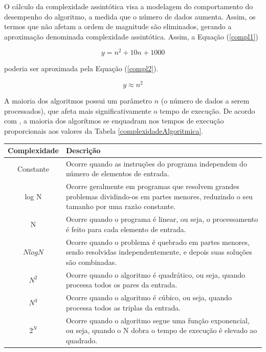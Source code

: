 {	 O cálculo da complexidade assintótica visa a modelagem do comportamento do desempenho do algoritmo, a medida que o número de dados aumenta. Assim, os termos que não afetam a ordem de magnitude são eliminados, gerando a aproximação denominada complexidade assintótica. Assim, a  Equação (\ref{compl1})

	\begin{equation}
		y = n^{2} +10 n + 1000
	\label{compl1}
	\end{equation}

	 poderia ser aproximada pela  Equação (\ref{compl2}).


	\begin{equation}
		y \approx  n^{2} 
	\label{compl2}
	\end{equation}

	A maioria dos algoritmos possui um parâmetro $n$ (o número de dados a serem processados), que afeta mais significativamente o tempo de execução. De acordo com \cite{complexidade2}, a maioria dos algorítmos se enquadram nos tempos de execução proporcionais aos valores da Tabela \ref{complexidadeAlgoritmica}.

\begin{table}[ht]
	\centering	
	\begin{tabularx}{0.9\textwidth}{cX}
		\toprule
		\textbf{Complexidade} & \textbf{Descrição}  \\
		\midrule
		Constante &  Ocorre quando as instruções do programa independem do número de elementos de entrada.\\
		log N & Ocorre geralmente em programas que resolvem grandes problemas dividindo-os em partes menores, reduzindo o seu tamanho por uma razão constante.  \\
		N & Ocorre quando o programa é linear, ou seja, o  processamento é feito para cada elemento de entrada. \\
		$ N log N$ & Ocorre quando o problema é quebrado em partes menores, sendo resolvidas independentemente, e depois suas soluções são combinadas. \\
		$ N^{2}$ & Ocorre quando o algoritmo é quadrático, ou seja, quando processa todos os pares da entrada. \\
		$ N^{3}$ & Ocorre quando o algoritmo é cúbico, ou seja, quando processa todos as triplas da entrada. \\
		$ 2^{N}$ & Ocorre quando o algoritmo segue uma função exponencial, ou seja, quando o N dobra o tempo de execução é elevado ao quadrado. \\
	

\end{tabularx}
\end{table}}
